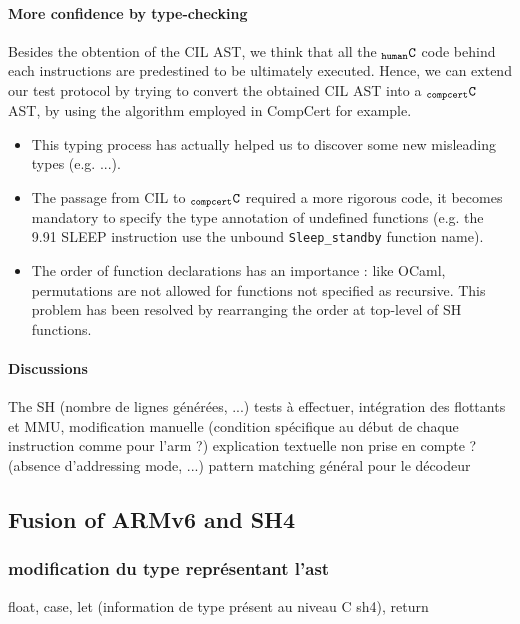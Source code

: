\documentclass[a4paper, 11pt]{article}
\newcommand{\C}{$_{\tt compcert}{\tt C}$\xspace}
\newcommand{\hC}{$_{\tt human}{\tt C}$\xspace}
\begin{document}
    \paragraph{More confidence by type-checking}
Besides the obtention of the CIL AST, we think that all the \hC code behind each instructions are predestined to be ultimately executed. Hence, we can extend our test protocol by trying to convert the obtained CIL AST into a \C AST, by using the algorithm employed in CompCert for example. 

\begin{itemize}
\item This typing process has actually helped us to discover some new misleading types (e.g. ...). 
\item The passage from CIL to \C required a more rigorous code, it becomes mandatory to specify the type annotation of undefined functions (e.g. the 9.91 SLEEP instruction use the unbound \verb|Sleep_standby| function name). 
\item The order of function declarations has an importance : like OCaml, permutations are not allowed for functions not specified as recursive. This problem has been resolved by rearranging the order at top-level of SH functions.

\end{itemize}



    \paragraph{Discussions} 
The SH
      (nombre de lignes générées, ...)
      tests à effectuer, intégration des flottants et MMU, modification manuelle (condition spécifique au début de chaque instruction comme pour l'arm ?) explication textuelle non prise en compte ?
 (absence d'addressing mode, ...)
pattern matching général pour le décodeur

  \subsection{Fusion of ARMv6 and SH4}
    \subsubsection{modification du type représentant l'ast} 
    float, case, let (information de type présent au niveau C sh4), return
\end{document}

